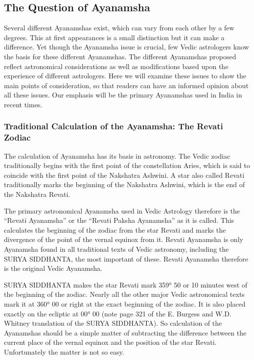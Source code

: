  

\subsection{The Question of Ayanamsha}
 



 

Several different Ayanamshas exist, which can vary from each other by a few degrees. This at first appearances is a small distinction but it can make a difference. Yet though the Ayanamsha issue is crucial, few Vedic astrologers know the basis for these different Ayanamshas. The different Ayanamshas proposed reflect astronomical considerations as well as modifications based upon the experience of different astrologers. Here we will examine these issues to show the main points of consideration, so that readers can have an informed opinion about all these issues. Our emphasis will be the primary Ayanamshas used in India in recent times.

 

\subsubsection{Traditional Calculation of the Ayanamsha: The Revati Zodiac}

 

The calculation of Ayanamsha has its basis in astronomy. The Vedic zodiac traditionally begins with the first point of the constellation Aries, which is said to coincide with the first point of the Nakshatra Ashwini. A star also called Revati traditionally marks the beginning of the Nakshatra Ashwini, which is the end of the Nakshatra Revati.

 

The primary astronomical Ayanamsha used in Vedic Astrology therefore is the “Revati Ayanamsha” or the “Revati Paksha Ayanamsha” as it is called. This calculates the beginning of the zodiac from the star Revati and marks the divergence of the point of the vernal equinox from it. Revati Ayanamsha is only Ayanamsha found in all traditional texts of Vedic astronomy, including the SURYA SIDDHANTA, the most important of these. Revati Ayanamsha therefore is the original Vedic Ayanamsha.

 

SURYA SIDDHANTA makes the star Revati mark 359° 50 or 10 minutes west of the beginning of the zodiac. Nearly all the other major Vedic astronomical texts mark it at 360° 00 or right at the exact beginning of the zodiac. It is also placed exactly on the ecliptic at 00° 00 (note page 321 of the E. Burgess and W.D. Whitney translation of the SURYA SIDDHANTA). So calculation of the Ayanamshas should be a simple matter of subtracting the difference between the current place of the vernal equinox and the position of the star Revati. Unfortunately the matter is not so easy.


